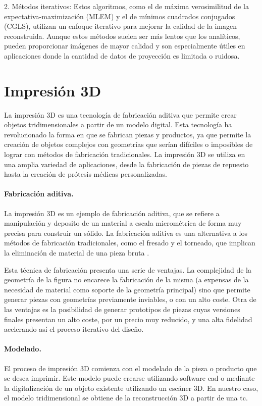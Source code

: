 2. Métodos iterativos: Estos algoritmos, como el de máxima verosimilitud de la expectativa-maximización (MLEM) y el de mínimos cuadrados conjugados (CGLS), utilizan un enfoque iterativo para mejorar la calidad de la imagen reconstruida. Aunque estos métodos suelen ser más lentos que los analíticos, pueden proporcionar imágenes de mayor calidad y son especialmente útiles en aplicaciones donde la cantidad de datos de proyección es limitada o ruidosa.



\section{Impresión 3D}

La impresión 3D es una tecnología de fabricación aditiva que permite crear objetos tridimensionales a partir de un modelo digital. Esta tecnología ha revolucionado la forma en que se fabrican piezas y productos, ya que permite la creación de objetos complejos con geometrías que serían difíciles o imposibles de lograr con métodos de fabricación tradicionales. La impresión 3D se utiliza en una amplia variedad de aplicaciones, desde la fabricación de piezas de repuesto hasta la creación de prótesis médicas personalizadas.

\paragraph{Fabricación aditiva.}
La impresión 3D es un ejemplo de fabricación aditiva, que se refiere a manipulación y deposito de un material a escala micrométrica de forma muy precisa para construir un sólido. La fabricación aditiva es una alternativa a los métodos de fabricación tradicionales, como el fresado y el torneado, que implican la eliminación de material de una pieza bruta \cite{zahera2012fabricacion}.

Esta técnica de fabricación presenta una serie de ventajas. La complejidad de la geometría de la figura no encarece la fabricación de la misma (a expensas de la necesidad de material como soporte de la geometría principal) sino que permite generar piezas con geometrías previamente inviables, o con un alto coste.
Otra de las ventajas es la posibilidad de generar prototipos de piezas cuyas versiones finales presentan un alto coste, por un precio muy reducido, y una alta fidelidad acelerando así el proceso iterativo del diseño.

\paragraph{Modelado.}
El proceso de impresión 3D comienza con el modelado de la pieza o producto que se desea imprimir. Este modelo puede crearse utilizando software \acrfull{cad} o mediante la digitalización de un objeto existente utilizando un escáner 3D. En nuestro caso, el modelo tridimensional se obtiene de la reconstrucción 3D a partir de una \acrshort{tc}.

